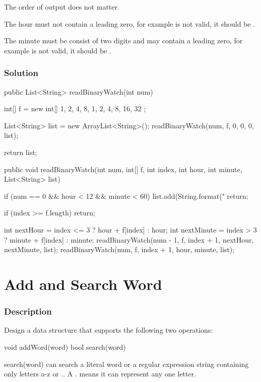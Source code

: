 The order of output does not matter.

The hour must not contain a leading zero, for example  is not valid, it should be .

The minute must be consist of two digits and may contain a leading zero, for example  is not valid, it should be .

\subsubsection{Solution}
\begin{Code}
public List<String> readBinaryWatch(int num) {
    int[] f = new int[] {
            1, 2, 4, 8, 1, 2, 4, 8, 16, 32
    };

    List<String> list = new ArrayList<String>();
    readBinaryWatch(num, f, 0, 0, 0, list);

    return list;
}
\end{Code}

\newpage

\begin{Code}
public void readBinaryWatch(int num, int[] f, int index, int hour, int minute, List<String> list) {
    if (num == 0 && hour < 12 && minute < 60) {
        list.add(String.format("%
        return;
    }

    if (index >= f.length) {
        return;
    }

    int nextHour = index <= 3 ? hour + f[index] : hour;
    int nextMinute = index > 3 ? minute + f[index] : minute;
    readBinaryWatch(num - 1, f, index + 1, nextHour, nextMinute, list);
    readBinaryWatch(num, f, index + 1, hour, minute, list);
}
\end{Code}

\newpage

\section{Add and Search Word} %

\subsubsection{Description}

Design a data structure that supports the following two operations:
\begin{Code}
void addWord(word)
bool search(word)
\end{Code}
search(word) can search a literal word or a regular expression string containing only letters a-z or .. A . means it can represent any one letter.

